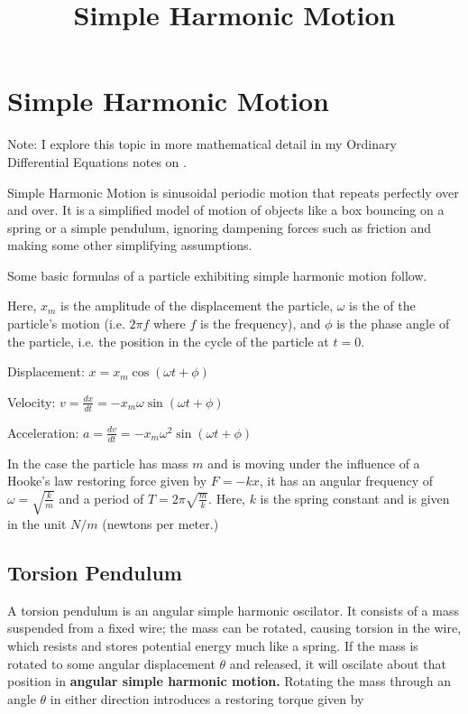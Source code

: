 \documentclass{article}
\title{Simple Harmonic Motion}
\begin{document}
\section{Simple Harmonic Motion}

Note: I explore this topic in more mathematical detail in my Ordinary Differential Equations notes on .

Simple Harmonic Motion is sinusoidal periodic motion that repeats perfectly over and over. It is a simplified model of motion of objects like a box bouncing on a spring or a simple pendulum, ignoring dampening forces such as friction and making some other simplifying assumptions.

Some basic formulas of a particle exhibiting simple harmonic motion follow.

Here, $x_m$ is the amplitude of the displacement the particle, $\omega$ is the  of the particle's motion (i.e. $2 \pi f$ where $f$ is the frequency), and $\phi$ is the phase angle of the particle, i.e. the position in the cycle of the particle at $t = 0$. 

Displacement: $x = x_m \cos{(\omega t + \phi)}$

Velocity: $v = \frac{dx}{dt} = - x_m \omega \sin{(\omega t + \phi)}$

Acceleration: $a = \frac{dv}{dt} = - x_m \omega^2 \sin{(\omega t + \phi)}$

In the case the particle has mass $m$ and is moving under the influence of a Hooke's law restoring force given by $F = -kx$, it has an angular frequency of $\omega = \sqrt{\frac{k}{m}}$ and a period of $T = 2 \pi \sqrt{\frac{m}{k}}.$ Here, $k$ is the spring constant and is given in the unit $N/m$ (newtons per meter.)

\subsection{Torsion Pendulum}

A torsion pendulum is an angular simple harmonic oscilator. It consists of a mass suspended from a fixed wire; the mass can be rotated, causing torsion in the wire, which resists and stores potential energy much like a spring. If the mass is rotated to some angular displacement $\theta$ and released, it will oscilate about that position in \textbf{angular simple harmonic motion.} Rotating the mass through an angle $\theta$ in either direction introduces a restoring torque given by
\end{document}
